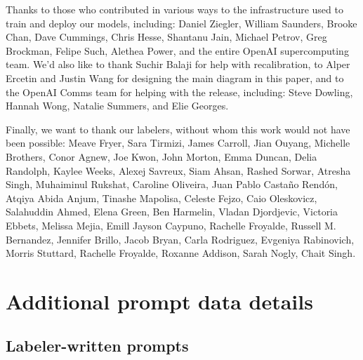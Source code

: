 \documentclass{article}
\begin{document}
Thanks to those who contributed in various ways to the infrastructure used to train and deploy our models, including: Daniel Ziegler, William Saunders, Brooke Chan, Dave Cummings, Chris Hesse, Shantanu Jain, Michael Petrov, Greg Brockman, Felipe Such, Alethea Power, and the entire OpenAI supercomputing team. We'd also like to thank Suchir Balaji for help with recalibration, to Alper Ercetin and Justin Wang for designing the main diagram in this paper, and to the OpenAI Comms team for helping with the release, including: Steve Dowling, Hannah Wong, Natalie Summers, and Elie Georges.

Finally, we want to thank our labelers, without whom this work would not have been possible: Meave Fryer, Sara Tirmizi, James Carroll, Jian Ouyang, Michelle Brothers, Conor Agnew, Joe Kwon, John Morton, Emma Duncan, Delia Randolph, Kaylee Weeks, Alexej Savreux, Siam Ahsan, Rashed Sorwar, Atresha Singh, Muhaiminul Rukshat, Caroline Oliveira, Juan Pablo Casta{\~n}o Rend{\'o}n, Atqiya Abida Anjum, Tinashe Mapolisa,
Celeste Fejzo, Caio Oleskovicz, Salahuddin Ahmed, Elena Green, Ben Harmelin, Vladan Djordjevic, Victoria Ebbets, Melissa Mejia, Emill Jayson Caypuno, Rachelle Froyalde, Russell M. Bernandez, Jennifer Brillo, Jacob Bryan, Carla Rodriguez, Evgeniya Rabinovich, Morris Stuttard, Rachelle Froyalde, Roxanne Addison, Sarah Nogly, Chait Singh.


 

\newpage

\appendix

\section{Additional prompt data details}
\label{apdx:prompt-data}

\subsection{Labeler-written prompts}
\end{document}
